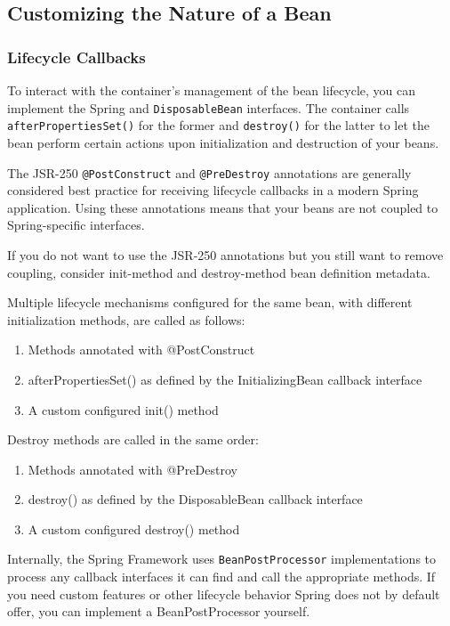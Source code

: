 \documentclass{scrartcl}
\begin{document}
\subsection{Customizing the Nature of a Bean}
\subsubsection{Lifecycle Callbacks}

To interact with the container’s management of the bean lifecycle, you can implement the Spring
\lstinline|| and \lstinline|DisposableBean| interfaces. The container calls \lstinline|afterPropertiesSet()| for the
former and \lstinline|destroy()| for the latter to let the bean perform certain actions upon initialization and
destruction of your beans.

The JSR-250 \lstinline|@PostConstruct| and \lstinline|@PreDestroy| annotations are generally considered
best practice for receiving lifecycle callbacks in a modern Spring application. Using these annotations means that your beans are not coupled to Spring-specific
interfaces.

If you do not want to use the JSR-250 annotations but you still want to remove
coupling, consider init-method and destroy-method bean definition metadata.

Multiple lifecycle mechanisms configured for the same bean, with different initialization methods,
are called as follows:

\begin{enumerate}
    \item Methods annotated with @PostConstruct
    \item afterPropertiesSet() as defined by the InitializingBean callback interface
    \item A custom configured init() method
\end{enumerate}

Destroy methods are called in the same order:

\begin{enumerate}
    \item Methods annotated with @PreDestroy
    \item destroy() as defined by the DisposableBean callback interface
    \item A custom configured destroy() method
\end{enumerate}

Internally, the Spring Framework uses \lstinline|BeanPostProcessor| implementations to process any callback
interfaces it can find and call the appropriate methods. If you need custom features or other
lifecycle behavior Spring does not by default offer, you can implement a BeanPostProcessor yourself.
\end{document}
